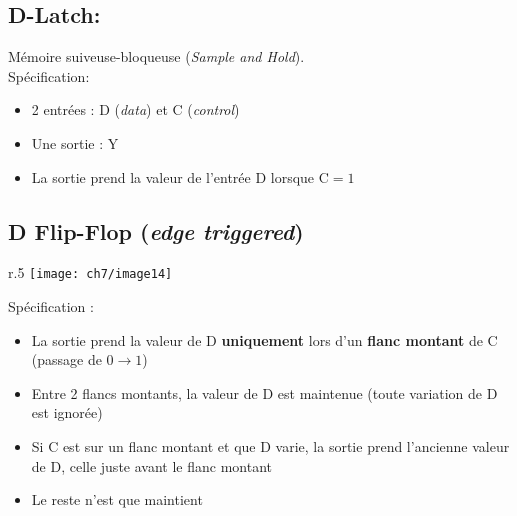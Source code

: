 \subsection{D-Latch:} Mémoire suiveuse-bloqueuse (\textit{Sample and Hold}).\\
Spécification:
\begin{itemize}
	\item 2 entrées : D (\textit{data}) et C (\textit{control})
	\item Une sortie : Y
	\item La sortie prend la valeur de l'entrée D lorsque C$=1$
\end{itemize}
\subsection{D Flip-Flop (\textit{edge triggered})}
\begin{wrapfigure}{r}{.5\textwidth}
	\centering
	\texttt{[image: ch7/image14]}
\end{wrapfigure}
Spécification :
\begin{itemize}
	\item La sortie prend la valeur de D \textbf{uniquement} lors d'un \textbf{flanc montant} de C (passage de $0\rightarrow 1$)
	\item Entre 2 flancs montants, la valeur de D est maintenue (toute variation de D est ignorée)
	\item Si C est sur un flanc montant et que D varie, la sortie prend l'ancienne valeur de D, celle juste avant le flanc montant 
	\item Le reste n'est que maintient
\end{itemize}
